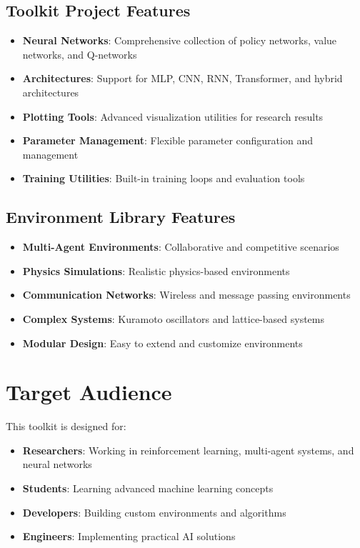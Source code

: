 \subsection{Toolkit Project Features}

\begin{itemize}
    \item \textbf{Neural Networks}: Comprehensive collection of policy networks, value networks, and Q-networks
    \item \textbf{Architectures}: Support for MLP, CNN, RNN, Transformer, and hybrid architectures
    \item \textbf{Plotting Tools}: Advanced visualization utilities for research results
    \item \textbf{Parameter Management}: Flexible parameter configuration and management
    \item \textbf{Training Utilities}: Built-in training loops and evaluation tools
\end{itemize}

\subsection{Environment Library Features}

\begin{itemize}
    \item \textbf{Multi-Agent Environments}: Collaborative and competitive scenarios
    \item \textbf{Physics Simulations}: Realistic physics-based environments
    \item \textbf{Communication Networks}: Wireless and message passing environments
    \item \textbf{Complex Systems}: Kuramoto oscillators and lattice-based systems
    \item \textbf{Modular Design}: Easy to extend and customize environments
\end{itemize}

\section{Target Audience}

This toolkit is designed for:

\begin{itemize}
    \item \textbf{Researchers}: Working in reinforcement learning, multi-agent systems, and neural networks
    \item \textbf{Students}: Learning advanced machine learning concepts
    \item \textbf{Developers}: Building custom environments and algorithms
    \item \textbf{Engineers}: Implementing practical AI solutions
\end{itemize}

